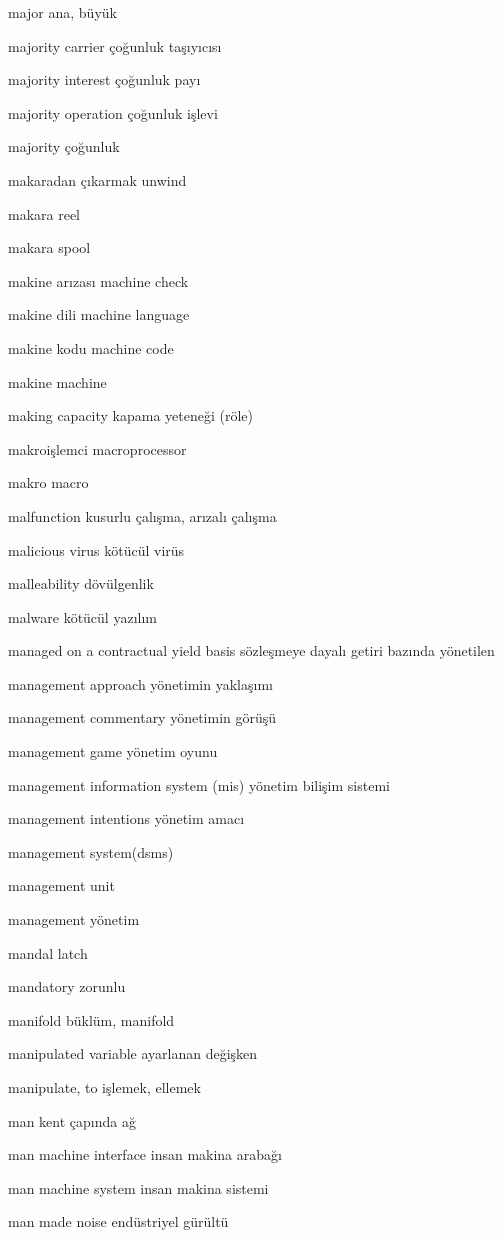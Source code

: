 \documentclass[12pt,fleqn]{article}\usepackage{../../common}
\begin{document}
major ana, büyük

majority carrier çoğunluk taşıyıcısı

majority interest çoğunluk payı

majority operation çoğunluk işlevi

majority çoğunluk

makaradan çıkarmak unwind

makara reel

makara spool

makine arızası machine check

makine dili machine language

makine kodu machine code

makine machine

making capacity kapama yeteneği (röle)

makroişlemci macroprocessor

makro macro

malfunction kusurlu çalışma, arızalı çalışma

malicious virus kötücül virüs

malleability dövülgenlik

malware kötücül yazılım

managed on a contractual yield basis sözleşmeye dayalı getiri bazında yönetilen

management approach yönetimin yaklaşımı

management commentary yönetimin görüşü

management game yönetim oyunu

management information system (mis) yönetim bilişim sistemi

management intentions yönetim amacı

management system(dsms)

management unit

management yönetim

mandal latch

mandatory zorunlu

manifold büklüm, manifold

manipulated variable ayarlanan değişken

manipulate, to işlemek, ellemek

man kent çapında ağ

man machine interface insan makina arabağı

man machine system insan makina sistemi

man made noise endüstriyel gürültü
\end{document}
